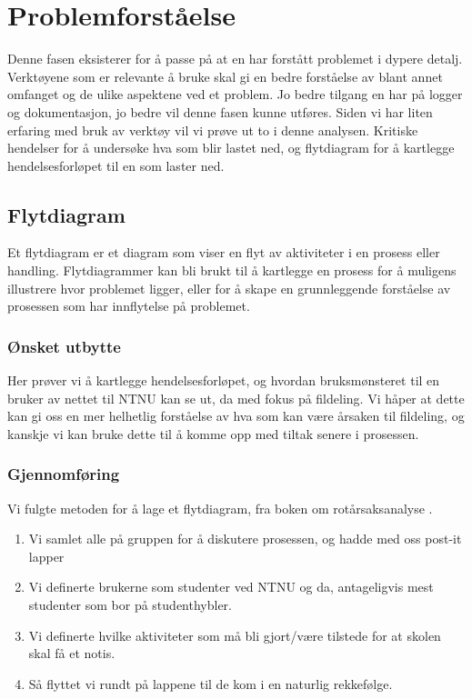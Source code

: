 \chapter{Problemforståelse}
Denne fasen eksisterer for å passe på at en har forstått problemet i dypere detalj. Verktøyene som er relevante å bruke skal gi en bedre forståelse av blant annet omfanget og de ulike aspektene ved et problem. Jo bedre tilgang en har på logger og dokumentasjon, jo bedre vil denne fasen kunne utføres. Siden vi har liten erfaring med bruk av verktøy vil vi prøve ut to i denne analysen. Kritiske hendelser for å undersøke hva som blir lastet ned, og flytdiagram for å kartlegge hendelsesforløpet til en som laster ned.

\section{Flytdiagram}
Et flytdiagram er et diagram som viser en flyt av aktiviteter i en prosess eller handling. Flytdiagrammer kan bli brukt til å kartlegge en prosess for å muligens illustrere hvor problemet ligger, eller for å skape en grunnleggende forståelse av prosessen som har innflytelse på problemet. 

\subsection{Ønsket utbytte}
Her prøver vi å kartlegge hendelsesforløpet, og hvordan bruksmønsteret til en bruker av nettet til NTNU kan se ut, da med fokus på fildeling. Vi håper at dette kan gi oss en mer helhetlig forståelse av hva som kan være årsaken til fildeling, og kanskje vi kan bruke dette til å komme opp med tiltak senere i prosessen.

\subsection{Gjennomføring}
Vi fulgte metoden for å lage et flytdiagram, fra boken om rotårsaksanalyse \cite{RCA}.
\begin{enumerate}
    \item Vi samlet alle på gruppen for å diskutere prosessen, og hadde med oss post-it lapper
    \item Vi definerte brukerne som studenter ved NTNU og da, antageligvis mest studenter som bor på studenthybler.
    \item Vi definerte hvilke aktiviteter som må bli gjort/være tilstede for at skolen skal få et notis.
    \item Så flyttet vi rundt på lappene til de kom i en naturlig rekkefølge.
\end{enumerate}


